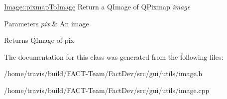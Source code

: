 \hyperlink{classGui_1_1Utils_1_1Image_abd2651b6ee762ee438231288887235df}{Image\-::pixmap\-To\-Image} Return a Q\-Image of Q\-Pixmap {\itshape image} 


\begin{DoxyParams}{Parameters}
{\em pix} & An image \\
\hline
\end{DoxyParams}
\begin{DoxyReturn}{Returns}
Q\-Image of pix 
\end{DoxyReturn}


The documentation for this class was generated from the following files\-:\begin{DoxyCompactItemize}
\item 
/home/travis/build/\-F\-A\-C\-T-\/\-Team/\-Fact\-Dev/src/gui/utils/image.\-h\item 
/home/travis/build/\-F\-A\-C\-T-\/\-Team/\-Fact\-Dev/src/gui/utils/image.\-cpp\end{DoxyCompactItemize}
